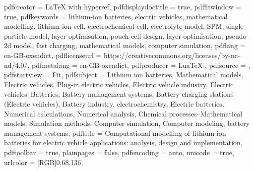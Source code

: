 {    pdfcreator         = {LaTeX with hyperref},
    pdfdisplaydoctitle = true,
    pdffitwindow       = true,
    pdfkeywords        = {lithium-ion batteries, electric vehicles, mathematical modelling, lithium-ion cell, electrochemical cell, electrolyte model, SPM, single particle model, layer optimisation, pouch cell design, layer optimisation, pseudo-2d model, fast charging, mathematical models, computer simulation},
    pdflang            = {en-GB-oxendict},
    pdflicenseurl      = {https://creativecommons.org/licenses/by-nc-nd/4.0/},
    pdfmetalang        = {en-GB-oxendict},
    pdfproducer        = {LuaTeX-\luatexversionused},
    pdfsource          = {},
    pdfstartview       = {Fit},
    pdfsubject         = {Lithium ion batteries, Mathematical models, Electric vehicles, Plug-in electric vehicles, Electric vehicle industry, Electric vehicles--Batteries, Battery management systems, Battery charging stations (Electric vehicles), Battery industry, electrochemistry, Electric batteries, Numerical calculations, Numerical analysis, Chemical processes--Mathematical models, Simulation methods, Computer simulation, Computer modeling, battery management systems},
    pdftitle           = {Computational modelling of lithium ion batteries for electric vehicle applications: analysis, design and implementation},
    pdftoolbar         = true,
    plainpages         = false,
    pdfencoding        = auto,
    unicode            = true,
    urlcolor           = [RGB]{0,68,136}, %
}%



\usepackage{nameref}
\usepackage{algorithm} %
\usepackage{hypcap} %

\usepackage{pdftexcmds} %

\usepackage{glossaries-extra} %

\usepackage{hypdestopt} %

\usepackage{bookmark} %
\usepackage{cleveref}

\newcommand{\blackurl}{\hypersetup{urlcolor=black}}%
\newcommand{\regularurl}{\hypersetup{urlcolor=[RGB]{0,68,136}}}%

